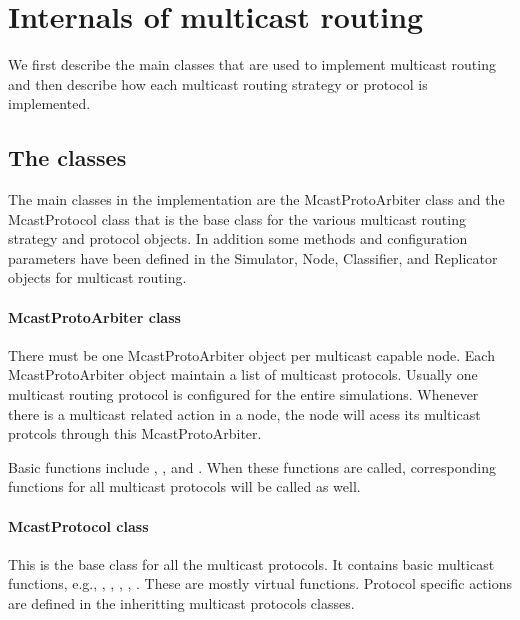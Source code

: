 
\section{Internals of multicast routing}
\label{sec:mcast-internals}

We first describe the main classes that are used to implement multicast
routing and then describe how each multicast routing strategy
or protocol is implemented.

\subsection{The classes}
The main classes in the implementation are
the McastProtoArbiter class and the McastProtocol class that is the base
class for the various multicast routing strategy and protocol objects.
In addition some methods and configuration parameters have been defined in
the Simulator, Node, Classifier, and Replicator objects for multicast
routing.

\paragraph{McastProtoArbiter class}
There must be one McastProtoArbiter object per multicast capable node.
Each  McastProtoArbiter object maintain a list of multicast protocols.
Usually one multicast routing protocol is configured for the entire
simulations.  Whenever there is a multicast related action in a node, the
node will acess its multicast protcols through this McastProtoArbiter.

Basic functions include , , and
.  When these functions are called, corresponding functions
for all multicast protocols will be called as well.

\paragraph{McastProtocol class}
This is the base class for all the multicast protocols.  It contains basic
multicast functions, e.g., , ,
, , .
These are mostly virtual functions.  Protocol specific actions are defined
in the inheritting multicast protocols classes.

